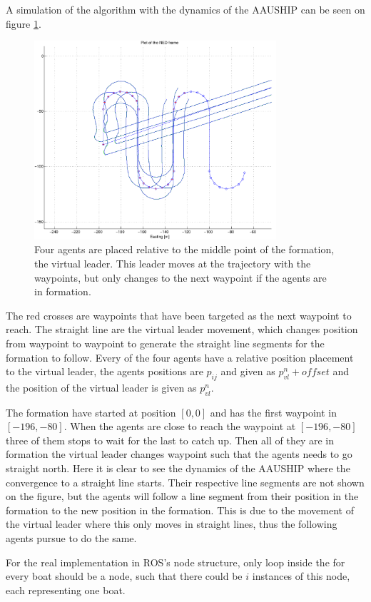 A simulation of the algorithm with the dynamics of the AAUSHIP can be seen on figure \ref{fig:potform}.
\begin{figure}[htbp]
  \includegraphics[width=0.8\textwidth]{fig/potform}
  \caption{Four agents are placed relative to the middle point of the formation, the virtual leader. This leader moves at the trajectory with the waypoints, but only changes to the next waypoint if the agents are in formation.}
  \label{fig:potform}
\end{figure}
The red crosses are waypoints that have been targeted as the next waypoint to reach. The straight line are the virtual leader movement, which changes position from waypoint to waypoint to generate the straight line segments for the formation to follow. Every of the four agents have a relative position placement to the virtual leader, the agents positions are $p_{ij}$ and given as $p^n_{vl} + offset$ and the position of the virtual leader is given as $p^n_{vl}$.

The formation have started at position $[0,0]$ and has the first waypoint in $[-196,-80]$. When the agents are close to reach the waypoint at $[-196,-80]$ three of them stops to wait for the last to catch up. Then all of they are in formation the virtual leader changes waypoint such that the agents needs to go straight north. Here it is clear to see the dynamics of the AAUSHIP where the convergence to a straight line starts. Their respective line segments are not shown on the figure, but the agents will follow a line segment from their position in the formation to the new position in the formation. This is due to the movement of the virtual leader where this only moves in straight lines, thus the following agents pursue to do the same.


For the real implementation in \ac{ROS}'s node structure, only loop
inside the for every boat should be a node, such that there could be
$i$ instances of this node, each representing one boat. 





